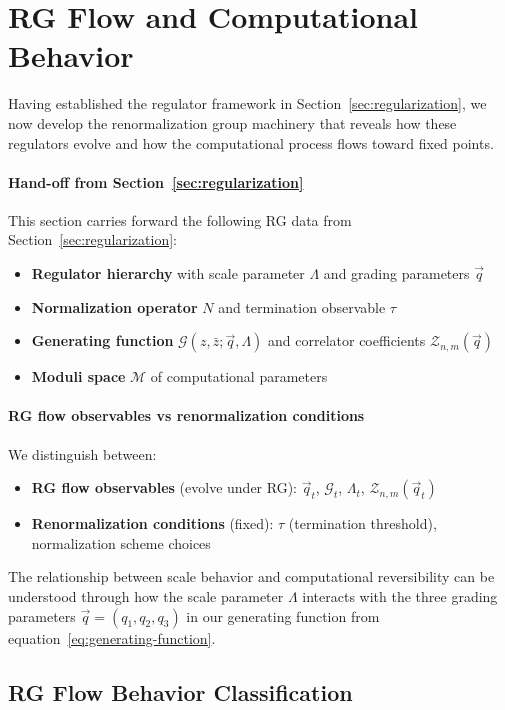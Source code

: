 \section{RG Flow and Computational Behavior}
\label{sec:rg-flow}

Having established the regulator framework in Section~\ref{sec:regularization}, we now develop the renormalization group machinery that reveals how these regulators evolve and how the computational process flows toward fixed points.

\paragraph{Hand-off from Section~\ref{sec:regularization}}
This section carries forward the following RG data from Section~\ref{sec:regularization}:
\begin{itemize}
\item \textbf{Regulator hierarchy} with scale parameter $\Lambda$ and grading parameters $\vec{q}$
\item \textbf{Normalization operator} $N$ and termination observable $\tau$
\item \textbf{Generating function} $\mathcal{G}(z,\bar{z};\vec{q},\Lambda)$ and correlator coefficients $\mathcal{Z}_{n,m}(\vec{q})$
\item \textbf{Moduli space} $\mathcal{M}$ of computational parameters
\end{itemize}

\paragraph{RG flow observables vs renormalization conditions}
We distinguish between:
\begin{itemize}
\item \textbf{RG flow observables} (evolve under RG): $\vec{q}_t$, $\mathcal{G}_t$, $\Lambda_t$, $\mathcal{Z}_{n,m}(\vec{q}_t)$
\item \textbf{Renormalization conditions} (fixed): $\tau$ (termination threshold), normalization scheme choices
\end{itemize}

The relationship between scale behavior and computational reversibility can be understood through how the scale parameter $\Lambda$ interacts with the three grading parameters $\vec{q} = (q_1, q_2, q_3)$ in our generating function from equation~\eqref{eq:generating-function}.

\subsection{RG Flow Behavior Classification}

